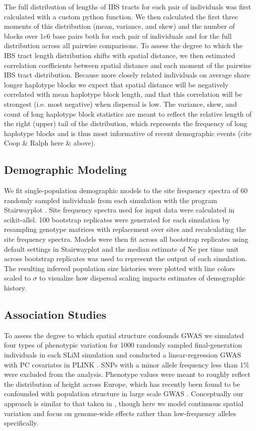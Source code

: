 \documentclass[9pt,twocolumn,twoside]{gsajnl}
\begin{document}
The full distribution of lengths of IBS tracts for each pair of individuals was first calculated with a custom python function. We then calculated the first three moments of this distribution (mean, variance, and skew) and the number of blocks over $1e6$ base pairs both for each pair of individuals and for the full distribution across all pairwise comparisons. To assess the degree to which the IBS tract length distribution shifts with spatial distance, we then estimated correlation coefficients between spatial distance and each moment of the pairwise IBS tract distribution. Because more closely related individuals on average share longer haplotype blocks we expect that spatial distance will be negatively correlated with mean haplotype block length, and that this correlation will be strongest (i.e. most negative) when dispersal is low. The variance, skew, and count of long haplotype block statistics are meant to reflect the relative length of the right (upper) tail of the distribution, which represents the frequency of long haplotype blocks and is thus most informative of recent demographic events \citep{Ringbauer2017} (cite Coop \& Ralph here \& above). 

\subsection{Demographic Modeling}
We fit single-population demographic models to the site frequency spectra of 60 randomly sampled individuals from each simulation with the program Stairwayplot \citep{Liu2015}. Site frequency spectra used for input data were calculated in scikit-allel. 100 bootstrap replicates were generated for each simulation by resampling genotype matrices with replacement over sites and recalculating the site frequency spectra. Models were then fit across all bootstrap replicates using default settings in Stairwayplot and the median estimate of Ne per time unit across bootstrap replicates was used to represent the output of each simulation. The resulting inferred population size histories were plotted with line colors scaled to $\sigma$ to visualize how dispersal scaling impacts estimates of demographic history.  

\subsection{Association Studies}
To assess the degree to which spatial structure confounds GWAS we simulated four types of phenotypic variation for 1000 randomly sampled final-generation individuals in each SLiM simulation and conducted a linear-regression GWAS with PC covariates in PLINK \citep{PURCELL2007}. SNPs with a minor allele frequency less than 1\% were excluded from the analysis. Phenotype values were meant to roughly reflect the distribution of height across Europe, which has recently been found to be confounded with population structure in large scale GWAS \citep{Berg2018,Sohail2018}. Conceptually our approach is similar to that taken in \citep{Mathieson2012}, though here we model continuous spatial variation and focus on genome-wide effects rather than low-frequency alleles specifically. 
\end{document}
